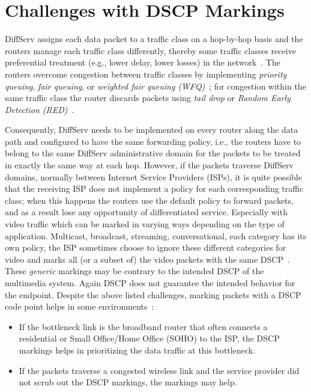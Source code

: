 

\section{Challenges with DSCP Markings}
\label{rg.ch.dscp}

DiffServ assigns each data packet to a traffic class on a hop-by-hop basis and
the routers manage each traffic class differently, thereby some traffic
classes receive preferential treatment (e.g., lower delay, lower losses) in
the network~\cite{rfc2475}. The routers overcome congestion between traffic
classes by implementing \emph{priority queuing}, \emph{fair queuing}, or
\emph{weighted fair queuing (WFQ)}~\cite{rfc4594}; for congestion within the
same traffic class the router discards packets using \emph{tail drop} or
\emph{Random Early Detection (RED)}~\cite{Floyd:RED}.


Consequently, DiffServ needs to be implemented on every router along the data
path and configured to have the same forwarding policy, i.e., the routers have
to belong to the same DiffServ administrative domain for the packets to be
treated in exactly the same way at each hop. However, if the packets traverse
DiffServ domains, normally between Internet Service Providers (ISPs), it is
quite possible that the receiving ISP does not implement a policy for each
corresponding traffic class; when this happens the routers use the default
policy to forward packets, and as a result lose any opportunity of
differentiated service. Especially with video traffic which can be marked in
varying ways depending on the type of application. Multicast, broadcast,
streaming, conversational, each category has its own policy, the ISP sometimes
choose to ignore these different categories for video and marks all (or a
subset of) the video packets with the same DSCP~\cite{rfc5865}. These
\emph{generic} markings may be contrary to the intended DSCP of the multimedia
system. Again DSCP does not guarantee the intended behavior for the endpoint.
Despite the above listed challenges, marking packets with a DSCP code point
helps in some environments~\cite{draft.rtcweb.qos}:


\begin{itemize}

  \item If the bottleneck link is the broadband router that often connects a
  residential or Small Office/Home Office (SOHO) to the ISP, the DSCP markings
  helps in prioritizing the data traffic at this bottleneck.

  \item If the packets traverse a congested wireless link and the service
  provider did not scrub out the DSCP markings, the markings may help.

\end{itemize}

